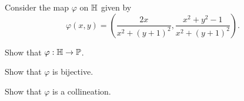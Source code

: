 \Exercises%

\begin{exercise}
Consider the map \(\varphi\) on \(\mathbb{H}\) given by \[ \varphi(x,y) = \left( \frac{2x}{x^2 + (y+1)^2}, \frac{x^2 + y^2 - 1}{x^2 + (y+1)^2} \right). \]
\begin{proplist}
\item Show that \(\varphi : \mathbb{H} \rightarrow \mathbb{P}\).
\item Show that \(\varphi\) is bijective.
\item Show that \(\varphi\) is a collineation.
\end{proplist}
\end{exercise}

